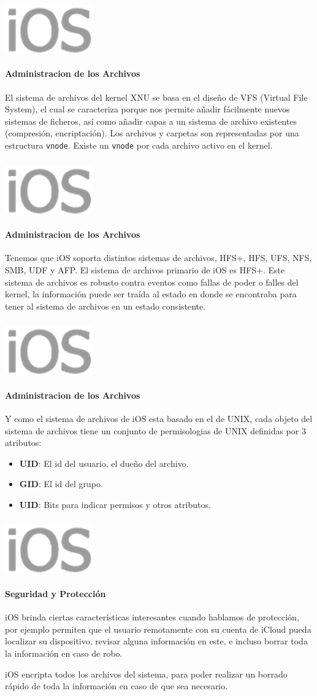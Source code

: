 \documentclass{beamer}
\newcommand*{\ioslogo}{\includegraphics[scale=0.25]{img/logo2.png} \ }%
\begin{document}
\begin{frame}
	\frametitle{\ioslogo}
	\framesubtitle{Administracion de los Archivos}

	El sistema de archivos del kernel XNU se basa en el diseño de VFS (Virtual File System), el cual se caracteriza porque nos permite añadir fácilmente nuevos sistemas de ficheros, así como añadir capas a un sistema de archivo existentes (compresión, encriptación). Los archivos y carpetas son representadas por una estructura \texttt{vnode}. Existe un \texttt{vnode} por cada archivo activo en el kernel.
\end{frame}

\begin{frame}
	\frametitle{\ioslogo}
	\framesubtitle{Administracion de los Archivos}
	
	Tenemos que iOS soporta distintos sistemas de archivos, HFS+, HFS, UFS, NFS, SMB, UDF y AFP. El sistema de archivos primario de iOS es HFS+. Este sistema de archivos es robusto contra eventos como fallas de poder o falles del kernel, la información puede ser traída al estado en donde se encontraba para tener al sistema de archivos en un estado consistente.
	
\end{frame}

\begin{frame}
\frametitle{\ioslogo}
\framesubtitle{Administracion de los Archivos}

	Y como el sistema de archivos de iOS esta basado en el de UNIX, cada objeto del sistema de archivos tiene un conjunto de permisologias de UNIX definidas por 3 atributos:
	\begin{itemize}
		\item \textbf{UID}: El id del usuario, el dueño del archivo.
		\item \textbf{GID}: El id del grupo.
		\item \textbf{UID}: Bits para indicar permisos y otros atributos.
	\end{itemize}
\end{frame}


\begin{frame}
	\frametitle{\ioslogo}
	\framesubtitle{Seguridad y Protección}
	
	iOS brinda ciertas características interesantes cuando hablamos de protección, por ejemplo permiten que el usuario remotamente con su cuenta de iCloud pueda localizar su dispositivo, revisar alguna información en este, e incluso borrar toda la información en caso de robo.

	iOS encripta todos los archivos del sistema, para poder realizar un borrado rápido de toda la información en caso de que sea necesario.
\end{frame}
\end{document}
